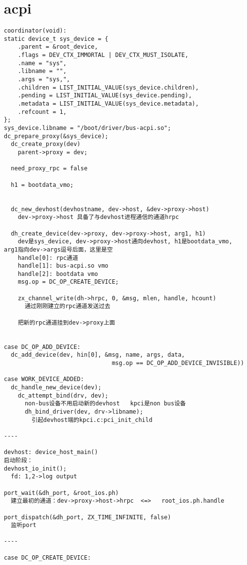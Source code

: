 \section{acpi}

\begin{verbatim}
coordinator(void):
static device_t sys_device = {
    .parent = &root_device,
    .flags = DEV_CTX_IMMORTAL | DEV_CTX_MUST_ISOLATE,
    .name = "sys",
    .libname = "",
    .args = "sys,",
    .children = LIST_INITIAL_VALUE(sys_device.children),
    .pending = LIST_INITIAL_VALUE(sys_device.pending),
    .metadata = LIST_INITIAL_VALUE(sys_device.metadata),
    .refcount = 1,
};
sys_device.libname = "/boot/driver/bus-acpi.so";
dc_prepare_proxy(&sys_device);   
  dc_create_proxy(dev) 
    parent->proxy = dev;

  need_proxy_rpc = false

  h1 = bootdata_vmo;


  dc_new_devhost(devhostname, dev->host, &dev->proxy->host)
    dev->proxy->host 具备了与devhost进程通信的通道hrpc

  dh_create_device(dev->proxy, dev->proxy->host, arg1, h1)
    dev是sys_device, dev->proxy->host通向devhost, h1是bootdata_vmo, arg1指向dev->args逗号后面，这里是空
    handle[0]: rpc通道
    handle[1]: bus-acpi.so vmo
    handle[2]: bootdata vmo
    msg.op = DC_OP_CREATE_DEVICE;

    zx_channel_write(dh->hrpc, 0, &msg, mlen, handle, hcount)
      通过刚刚建立的rpc通道发送过去
    
    把新的rpc通道挂到dev->proxy上面

  
case DC_OP_ADD_DEVICE:
  dc_add_device(dev, hin[0], &msg, name, args, data,
                               msg.op == DC_OP_ADD_DEVICE_INVISIBLE))

case WORK_DEVICE_ADDED:
  dc_handle_new_device(dev);
    dc_attempt_bind(drv, dev);
      non-bus设备不用启动新的devhost   kpci是non bus设备
      dh_bind_driver(dev, drv->libname);
        引起devhost端的kpci.c:pci_init_child

----

devhost: device_host_main()
启动阶段：
devhost_io_init();
  fd: 1,2->log output

port_wait(&dh_port, &root_ios.ph)
  建立最初的通道：dev->proxy->host->hrpc  <=>   root_ios.ph.handle

port_dispatch(&dh_port, ZX_TIME_INFINITE, false)
  监听port

----

case DC_OP_CREATE_DEVICE:
  

\end{verbatim}
